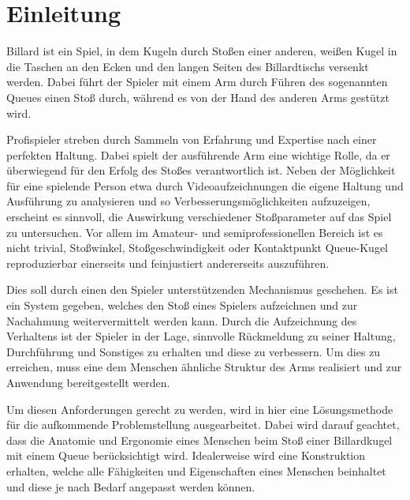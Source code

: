 \chapter{Einleitung}
	Billard ist ein Spiel, in dem Kugeln durch Stoßen einer anderen, weißen Kugel in die Taschen an den Ecken und den langen Seiten des Billardtischs versenkt werden.
	Dabei führt der Spieler mit einem Arm durch Führen des sogenannten Queues einen Stoß durch, während es von der Hand des anderen Arms gestützt wird.\par\medskip
	Profispieler streben durch Sammeln von Erfahrung und Expertise nach einer perfekten Haltung.
	Dabei spielt der ausführende Arm eine wichtige Rolle, da er überwiegend für den Erfolg des Stoßes verantwortlich ist.
	Neben der Möglichkeit für eine spielende Person etwa durch Videoaufzeichnungen die eigene Haltung und Ausführung zu analysieren und so Verbesserungsmöglichkeiten aufzuzeigen, erscheint es sinnvoll, die Auswirkung verschiedener Stoßparameter auf das Spiel zu untersuchen.
	Vor allem im Amateur- und semiprofessionellen Bereich ist es nicht trivial, Stoßwinkel, Stoßgeschwindigkeit oder Kontaktpunkt Queue-Kugel reproduzierbar einerseits und feinjustiert andererseits auszuführen.\par\medskip
	Dies soll durch einen den Spieler unterstützenden Mechanismus geschehen.
	Es ist ein System gegeben, welches den Stoß eines Spielers aufzeichnen und zur Nachahmung weitervermittelt werden kann.
	Durch die Aufzeichnung des Verhaltens ist der Spieler in der Lage, sinnvolle Rückmeldung zu seiner Haltung, Durchführung und Sonstiges zu erhalten und diese zu verbessern.
	Um dies zu erreichen, muss eine dem Menschen ähnliche Struktur des Arms realisiert und zur Anwendung bereitgestellt werden.\par
	Um diesen Anforderungen gerecht zu werden, wird in hier eine Lösungsmethode für die aufkommende Problemstellung ausgearbeitet.
	Dabei wird darauf geachtet, dass die Anatomie und Ergonomie eines Menschen beim Stoß einer Billardkugel mit einem Queue berücksichtigt wird.
	Idealerweise wird eine Konstruktion erhalten, welche alle Fähigkeiten und Eigenschaften eines Menschen beinhaltet und diese je nach Bedarf angepasst werden können.
